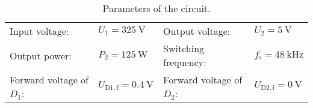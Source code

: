 
\begin{table}[htb]
    \centering  %
    \begin{tabular}{llll}
        \toprule
        Input voltage: &  $U_{\mathrm{1}} = \SI{325}{\volt}$ & Output voltage: & $U_{\mathrm{2}} = \SI{5}{\volt}$ \\ 
        Output power: & $P_{\mathrm{2}} = \SI{125}{\watt}$ & Switching frequency: & $f_{\mathrm{s}} = \SI{48}{\kilo\hertz}$ \\
        Forward voltage of $D_{\mathrm{1}}$: & $U_{\mathrm{D1,f}} = \SI{0.4}{\volt}$ & Forward voltage of $D_{\mathrm{2}}$: & $U_{\mathrm{D2,f}} = \SI{0}{\volt}$  \\
        \bottomrule
    \end{tabular}
    \caption{Parameters of the circuit.}  %
    \label{table:Ex04_Parameters of the singled ended forward converter.}
\end{table}